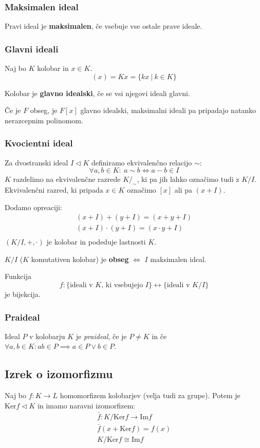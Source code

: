 \subsubsection*{Maksimalen ideal}
Pravi ideal je \textbf{maksimalen}, če vsebuje vse ostale prave ideale.

\subsubsection*{Glavni ideali}
Naj bo $K$ kolobar in $x \in K$.
\[ (x) = Kx = \{kx\ |\ k \in K\}\]

Kolobar je \textbf{glavno idealski}, če se vsi njegovi ideali glavni.

Če je $F$ obseg, je $F[x]$ glavno idealski, maksimalni ideali pa pripadajo natanko nerazcepnim polinomom.

\subsubsection*{Kvocientni ideal}
Za dvostranski ideal $I \lhd K$ definiramo ekvivalenčno relacijo $\sim$:
\[ \forall a,b \in K:\ a \sim b \iff a-b \in I \]
$K$ razdelimo na ekvivalenčne razrede $K/_\sim$, ki pa jih lahko označimo tudi z $K/I$. Ekvivalenčni razred, ki pripada $x \in K$ označimo $[x]$ ali pa $(x+I)$.

Dodamo opreaciji:
\begin{align*}
	(x+I) + (y + I) = (x+y+I) \\
	(x+I) \cdot (y + I) = (x\cdot y+I) \\
\end{align*}
$(K/I, +, \cdot)$ je kolobar in podeduje lastnosti $K$.

$K/I$ ($K$ komutativen kolobar) je \textbf{obseg} $\iff$ $I$ maksimalen ideal.

Funkcija 
\[f: \{\text{ideali v $K$, ki vsebujejo $I$}\} \leftrightarrow \{\text{ideali v $K/I$}\}\] je bijekcija.

\subsubsection*{Praideal}
Ideal $P$ v kolobarju $K$ je \emph{praideal}, če je $P \neq K$ in če $\forall a,b \in K: ab \in P \implies a \in P \vee b \in P$.

\subsection*{Izrek o izomorfizmu}
Naj bo $f: K \to L$ homomorfizem kolobarjev (velja tudi za grupe). Potem je $\text{Ker}f \lhd K$ in imamo naravni izomorfizem:
\begin{align*}
	\bar{f}: K/\text{Ker}f \to \text{Im}f\\
	\bar{f} (x + \text{Ker}f) = f(x) \\
	K/\text{Ker}f \cong \text{Im}f
\end{align*}

